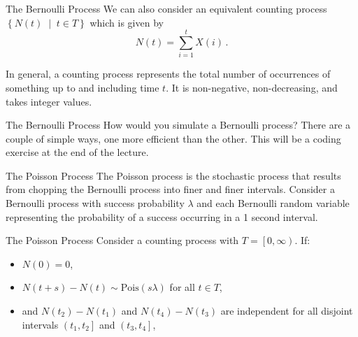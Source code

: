 \documentclass[10pt]{beamer}
\begin{document}
\begin{frame}[fragile]{The Bernoulli Process}
We can also consider an equivalent counting process \(\left\{N\left(t\right) \;\middle|\; t \in T\right\}\) which is given by
\begin{equation*}
    N\left(t\right) = \sum_{i = 1}^t X\left(i\right)\,.
\end{equation*}

In general, a counting process represents the total number of occurrences of something up to and including time \(t\). It is non-negative, non-decreasing, and takes integer values.
\end{frame}

\begin{frame}[fragile]{The Bernoulli Process}
How would you simulate a Bernoulli process? There are a couple of simple ways, one more efficient than the other. This will be a coding exercise at the end of the lecture.
\end{frame}

\begin{frame}[fragile]{The Poisson Process}
The Poisson process is the stochastic process that results from chopping the Bernoulli process into finer and finer intervals. Consider a Bernoulli process with success probability \(\lambda\) and each Bernoulli random variable representing the probability of a success occurring in a 1 second interval.
\end{frame}

\begin{frame}[fragile]{The Poisson Process}
Consider a counting process with \(T = \left[0, \infty\right)\). If:
\begin{itemize}[<+->]
    \item \(N\left(0\right) = 0\),
    \item \(N\left(t + s\right) - N\left(t\right) \sim \textrm{Pois}\left(s\lambda\right)\) for all \(t \in T\),
    \item and \(N\left(t_2\right) - N\left(t_1\right)\) and \(N\left(t_4\right) - N\left(t_3\right)\) are independent for all disjoint intervals \(\left(t_1, t_2\right]\) and \(\left(t_3, t_4\right]\),
\end{itemize}
\end{frame}
\end{document}
